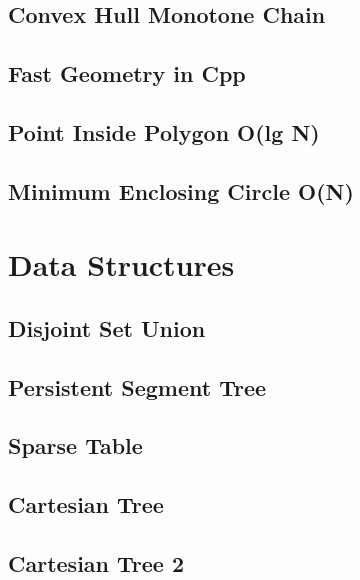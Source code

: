 \subsection{Convex Hull Monotone Chain}
\raggedbottom
\hrulefill
\subsection{Fast Geometry in Cpp}
\raggedbottom
\hrulefill
\subsection{Point Inside Polygon O(lg N)}
\raggedbottom
\hrulefill
\subsection{Minimum Enclosing Circle O(N)}
\raggedbottom
\hrulefill

\section{Data Structures}
\subsection{Disjoint Set Union}
\raggedbottom
\hrulefill
\subsection{Persistent Segment Tree}
\raggedbottom
\hrulefill
\subsection{Sparse Table}
\raggedbottom
\hrulefill
\subsection{Cartesian Tree}
\raggedbottom
\hrulefill
\subsection{Cartesian Tree 2}
\raggedbottom
\hrulefill

